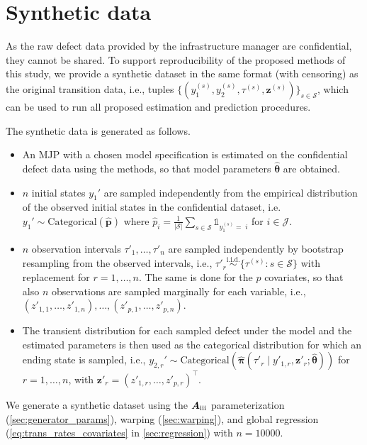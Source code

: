 \documentclass{article}
\newcommand{\RN}[1]{\textup{\uppercase\expandafter{\romannumeral#1}}}
\begin{document}
\begin{table}[h!]  
\centering
\caption{L1-norm of transition residuals $
|| \bm R || $ and normalized predictive entropy $H$ for different model settings.} \label{tab:transition_structure_L1}
\centering
\scriptsize
   
\end{table} 



\newpage

\section{Synthetic data} \label{sec:synthetic_data}
As the raw defect data provided by the infrastructure manager are confidential, they cannot be shared. To support reproducibility of the proposed methods of this study, we provide a synthetic dataset in the same format (with censoring) as the original transition data, i.e., tuples $\{(y_1^{(s)},y_2^{(s)},\tau^{(s)},\bm z^{(s)})\}_{s \in \mathcal S}$, which can be used to run all proposed estimation and prediction procedures.

The synthetic data is generated as follows.
\begin{itemize}
\item An MJP with a chosen model specification is estimated on the confidential defect data using the methods, so that model parameters $\widehat{\bm \theta}$ are obtained.
\item $n$ initial states $y_1'$ are sampled independently from the empirical distribution of the observed initial states in the confidential dataset, i.e.
$
y_1' \sim \text{Categorical}(\widehat{\bm p})$ where $\widehat p_i = \frac{1}{| \mathcal S|} \sum_{s\in\mathcal S} \mathds{1}_{y_1^{(s)}=\;i}
$ for $i \in \mathcal J$. 
\item $n$ observation intervals $\tau'_1,\dots,\tau'_n$ are sampled independently by bootstrap resampling from the observed intervals, i.e.,
$
\tau'_r \overset{\text{i.i.d.}}{\sim} \{\tau^{(s)}: s\in\mathcal S\} $ with replacement for $ r=1,\dots,n$. The same is done for the $p$ covariates, so that also $n$ observations are sampled marginally for each variable, i.e., $(z'_{1,1},\dots,z'_{1,n} ), \dots, (z'_{p,1},\dots,z'_{p,n})$. 
\item The transient distribution for each sampled defect under the model and the estimated parameters is then used as the categorical distribution for which an ending state is sampled, i.e., 
$
y_{2,r}' \sim \text{Categorical}(\widehat{\bm\pi}( \tau'_r \mid y'_{1,r}, \bm z'_r; \widehat{\bm\theta}) )
$ for $r = 1, \dots, n$, with $\bm z'_r = (z'_{1,r},\dots,z'_{p,r})^\top$.
\end{itemize}
We generate a synthetic dataset using the $\bm{A}_{\RN{3}}$ parameterization (\cref{sec:generator_params}), warping (\cref{sec:warping}), and global regression (\cref{eq:trans_rates_covariates} in \cref{sec:regression}) with $n = 10000$.
\end{document}
